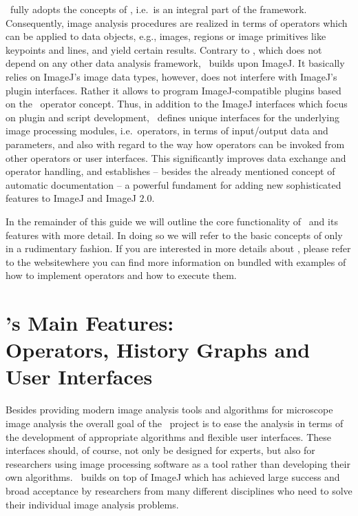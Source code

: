 \mitobo\ fully adopts the concepts of \alida, i.e.~\alida is an integral part of the \mitobo
framework. Consequently, image analysis procedures are realized in terms of operators which can be 
applied to data objects, e.g., images, regions or image primitives like keypoints and lines, 
and yield certain results. Contrary to \alida, which does not depend on any other data analysis
framework, \mitobo\ builds upon ImageJ. It basically relies on ImageJ's image data types, however,
does not interfere with ImageJ's plugin interfaces. Rather it allows to program ImageJ-compatible 
plugins based on the \alida\ operator concept.
Thus, in addition to the ImageJ interfaces which focus on plugin and script development,
\mitobo\ defines unique interfaces for the underlying image processing modules, i.e.~operators, in
terms of input/output data and parameters, and also with regard to the way how operators can be
invoked from other operators or user interfaces. This significantly improves data exchange and
operator handling, and establishes -- besides the already mentioned concept of automatic 
documentation -- a powerful fundament for adding new sophisticated features to ImageJ and ImageJ 
$2.0$. 

In the remainder of this guide we will outline the core functionality of \mitobo\ and its features with more 
detail. In doing so we will refer to the basic concepts of \alida only in a rudimentary fashion. 
If you are interested in more details about \alida, please refer to the \alida website\footnotemark[4] 
where you can find more information on \alida
bundled with examples of how to implement operators and how to execute them.

\section[\mitobo's Main Features: Operators, History Graphs and User Interfaces]
         {\mitobo's Main Features:\\ Operators, History Graphs and User Interfaces}
\label{sec:features}
\enlargethispage{0.2cm}
Besides providing modern image analysis tools and algorithms for microscope image analysis the
overall goal of the \mitobo\ project is to ease the analysis in terms of the development of appropriate algorithms and flexible user interfaces. These interfaces should, of
course, not only be designed for experts,
but also for researchers using image processing software as a tool rather than
developing their own
algorithms. \mitobo\ builds on top of ImageJ which has achieved large success and broad acceptance by researchers from
many different disciplines who need to solve their individual image analysis
problems. 

